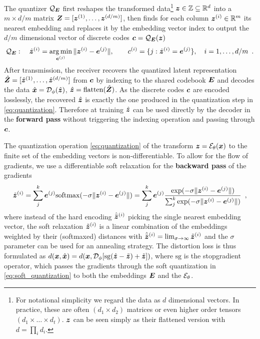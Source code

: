 \documentclass{article} %
\newcommand{\gEt}{\gE_\theta}
\newcommand{\gQE}{\gQ_\mE}
\newcommand{\gDp}{\gD_\phi}
\newcommand{\vzb}{\bar{\vz}}
\newcommand{\vzh}{\hat{\vz}}
\newcommand{\vzt}{\tilde{\vz}}
\newcommand{\vxh}{\hat{\vx}}
\begin{document}
The quantizer $\gQE$ first reshapes the transformed data\footnote{For notational simplicity we regard the data as $d$ dimensional vectors. In practice, these are often $(d_1 \times d_2)$ matrices or even higher order tensors $(d_1 \times \ldots \times d_t)$. ${\bm{z}}$ can be seen simply as their flattened version with $d = \prod_i d_i$.} ${\bm{z}} \in {\mathbb{Z}} \subseteq {\mathbb{R}}^{d}$ into a $m \times d/m$ matrix ${\bm{Z}} = [{\bm{z}}^{(1)}, \ldots, {\bm{z}}^{(d/m)}]$, then finds for each column ${\bm{z}}^{(i)} \in {\mathbb{R}}^m$ its nearest embedding and replaces it by the embedding vector index to output the $d/m$ dimensional vector of discrete codes $\vc = \gQE(\vz)$
\begin{align}\label{eq:quantization}
\gQE: \quad \vzh^{(i)} = \argmin_{\ve^{(j)}} \Vert \vz^{(i)} - \ve^{(j)} \Vert, \qquad \evc^{(i)} = \{j : \vzh^{(i)} = \ve^{(j)} \}, \quad i = 1, \ldots, d/m \enspace .
\end{align}
After transmission, the receiver recovers the quantized latent representation $\hat{\mZ} = [\vzh^{(1)}, \ldots, \vzh^{(d/m)}]$ from ${\bm{c}}$ by indexing to the shared codebook ${\bm{E}}$ and decodes the data $\vxh = \gDp(\vzh)$, $\vzh = \mathrm{flatten}(\hat{\mZ})$. 
As the discrete codes ${\bm{c}}$ are encoded losslessly, the recovered $\vzh$ is exactly the one produced in the quantization step in \eqref{eq:quantization}.
Therefore at training $\vzh$ can be used directly by the decoder in the \textbf{forward pass} without triggering the indexing operation and passing through ${\bm{c}}$.
 
The quantization operation \eqref{eq:quantization} of the transform $\vz = \gEt(\vx)$ to the finite set of the embedding vectors is non-differentiable.
To allow for the flow of gradients, we use a differentiable soft relaxation for the \textbf{backward pass} of the gradients 
\begin{align}\label{eq:soft_quantization}
\vzt^{(i)} = \sum_j^k \ve^{(j)} \softmax(-\sigma \Vert \vz^{(i)} - \ve^{(j)} \Vert) = \sum_j^k \ve^{(j)} \frac{\exp(-\sigma \Vert \vz^{(i)} - \ve^{(j)} \Vert)}{\sum_j^k \exp(-\sigma \Vert \vz^{(i)} - \ve^{(j)} \Vert)} \enspace ,
\end{align}
where instead of the hard encoding $\hat{\vzb}^{(i)}$ picking the single nearest embedding vector, the soft relaxation $\vzt^{(i)}$ is a linear combination of the embeddings weighted by their (softmaxed) distances with $\hat{\vzb}^{(i)} = \lim_{\sigma \to \infty} \vzt^{(i)}$ and the $\sigma$ parameter can be used for an annealing strategy.
The distortion loss is thus formulated as $d(\vx, \vxh) = d(\vx, \gDp[\mathrm{sg}(\vzh - \vzt) + \vzt])$, where $\mathrm{sg}$ is the stopgradient operator, which passes the gradients through the soft quantization in \eqref{eq:soft_quantization} to both the embeddings ${\bm{E}}$ and the $\gEt$.
\end{document}
